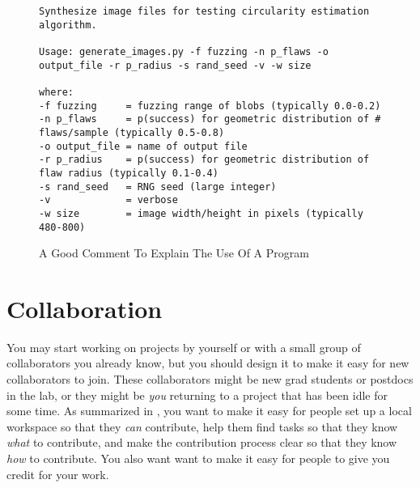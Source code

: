 \documentclass[10pt]{article}
\begin{document}
\begin{figure}
\begin{verbatim}
Synthesize image files for testing circularity estimation algorithm.

Usage: generate_images.py -f fuzzing -n p_flaws -o output_file -r p_radius -s rand_seed -v -w size

where:
-f fuzzing     = fuzzing range of blobs (typically 0.0-0.2)
-n p_flaws     = p(success) for geometric distribution of # flaws/sample (typically 0.5-0.8)
-o output_file = name of output file
-r p_radius    = p(success) for geometric distribution of flaw radius (typically 0.1-0.4)
-s rand_seed   = RNG seed (large integer)
-v             = verbose
-w size        = image width/height in pixels (typically 480-800)
\end{verbatim}
\caption{A Good Comment To Explain The Use Of A Program}
\label{fig:comment}
\end{figure}

\section{Collaboration}\label{sec:collaboration}

You may start working on projects by yourself or with a small group of
collaborators you already know, but you should design it to make it easy
for new collaborators to join. These collaborators might be new 
grad students or postdocs in the lab, or they might be \emph{you} 
returning to a project that has been idle for some time. As summarized 
in \cite{steinmacher2015}, you want to make it easy for people set up a 
local workspace so that they \emph{can} contribute, help them find tasks 
so that they know \emph{what} to contribute, and make the contribution 
process clear so that they know \emph{how} to contribute.  You also want 
want to make it easy for people to give you credit for your work. 
\end{document}
